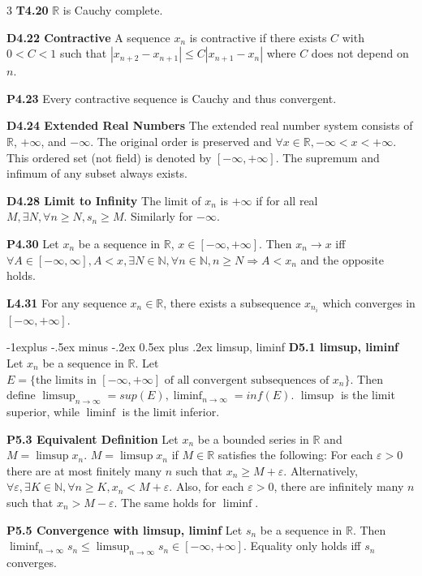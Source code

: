 \documentclass[10pt, landscape]{article}
\makeatletter
\renewcommand{\section}{\@startsection{section}{1}{0mm}%
                                {-1ex plus -.5ex minus -.2ex}%
                                {0.5ex plus .2ex}%
                                {\normalfont\large\bfseries}}
\renewcommand{\section}{\@startsection{section}{2}{0mm}%
                                {-1explus -.5ex minus -.2ex}%
                                {0.5ex plus .2ex}%
                                {\normalfont\normalsize\bfseries}}
\makeatother
\begin{document}
\begin{multicols*}{3}
\textbf{T4.20} $\mathbb{R}$ is Cauchy complete.

\textbf{D4.22 Contractive} A sequence $x_n$ is contractive if there exists $C$ with $0<C<1$ such that $|x_{n+2}-x_{n+1}|\leq C|x_{n+1}-x_n|$ where $C$ does not depend on $n$.

\textbf{P4.23} Every contractive sequence is Cauchy and thus convergent.

\textbf{D4.24 Extended Real Numbers} The extended real number system consists of $\mathbb{R}$, $+\infty$, and $-\infty$. The original order is preserved and $\forall x \in \mathbb{R}, -\infty < x < +\infty$. This ordered set (not field) is denoted by $[-\infty, +\infty]$. The supremum and infimum of any subset always exists.

\textbf{D4.28 Limit to Infinity} The limit of $x_n$ is $+\infty$ if for all real $M, \exists N, \forall n \geq N, s_n \geq M$. Similarly for $-\infty$.

\textbf{P4.30} Let $x_n$ be a sequence in $\mathbb{R}$, $x \in [-\infty, +\infty]$. Then $x_n \rightarrow x $ iff $\forall A \in [-\infty, \infty], A < x, \exists N \in \mathbb{N}, \forall n \in \mathbb{N}, n \geq N \Rightarrow A<x_n$ and the opposite holds.

\textbf{L4.31} For any sequence $x_n\in\mathbb{R}$, there exists a subsequence $x_{n_i}$ which converges in $[-\infty, +\infty]$.

\section{limsup, liminf}
\textbf{D5.1 limsup, liminf} Let $x_n$ be a sequence in $\mathbb{R}$. Let $E=\{\text{the limits in $[-\infty, +\infty]$ of all convergent subsequences of $x_n$}\}$. Then define $\limsup_{n \rightarrow \infty}=sup(E), \liminf_{n\rightarrow\infty}=inf(E)$. $\limsup$ is the limit superior, while $\liminf$ is the limit inferior.

\textbf{P5.3 Equivalent Definition} Let $x_n$ be a bounded series in $\mathbb{R}$ and $M=\limsup x_n$. $M=\limsup x_n$ if $M\in\mathbb{R}$ satisfies the following: For each $\varepsilon>0$ there are at most finitely many $n$ such that $x_n \geq M + \varepsilon$. Alternatively, $\forall\varepsilon, \exists K\in\mathbb{N}, \forall n \geq K, x_n < M + \varepsilon$. Also, for each $\varepsilon>0$, there are infinitely many $n$ such that $x_n > M-\varepsilon$. The same holds for $\liminf$.

\textbf{P5.5 Convergence with limsup, liminf} Let $s_n$ be a sequence in $\mathbb{R}$. Then $\liminf _{n \rightarrow\infty} s_n \leq \limsup_{n \rightarrow\infty} s_n \in [-\infty, +\infty]$. Equality only holds iff $s_n$ converges.


\end{multicols*}
\end{document}
